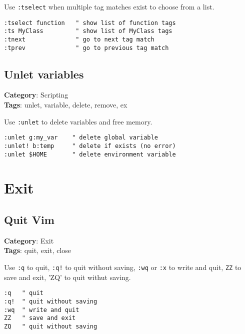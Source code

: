{{{{{{Use {\footnotesize \Verb§:tselect§} when multiple tag matches exist to choose from a list.

\begin{Exa*}{}
\begin{Verbatim}[fontsize=\footnotesize, breaklines, breakanywhere]
:tselect function   " show list of function tags
:ts MyClass         " show list of MyClass tags
:tnext              " go to next tag match
:tprev              " go to previous tag match
\end{Verbatim}
\end{Exa*}

\section{Unlet variables}

\textbf{Category}: Scripting\\ \textbf{Tags}: unlet, variable, delete, remove, ex
\vspace{0.5cm}

Use {\footnotesize \Verb§:unlet§} to delete variables and free memory.

\begin{Exa*}{}
\begin{Verbatim}[fontsize=\footnotesize, breaklines, breakanywhere]
:unlet g:my_var    " delete global variable
:unlet! b:temp     " delete if exists (no error)
:unlet $HOME       " delete environment variable
\end{Verbatim}
\end{Exa*}

\chapter{Exit}
\section{Quit Vim}

\textbf{Category}: Exit\\ \textbf{Tags}: quit, exit, close
\vspace{0.5cm}

Use {\footnotesize \Verb§:q§} to quit, {\footnotesize \Verb§:q!§} to quit without saving, {\footnotesize \Verb§:wq§} or {\footnotesize \Verb§:x§} to write and quit, {\footnotesize \Verb§ZZ§} to save and exit, 'ZQ' to quit withut saving. 

\begin{Exa*}{}
\begin{Verbatim}[fontsize=\footnotesize, breaklines, breakanywhere]
:q   " quit
:q!  " quit without saving
:wq  " write and quit
ZZ   " save and exit
ZQ   " quit without saving
\end{Verbatim}
\end{Exa*}

}}}}}}
